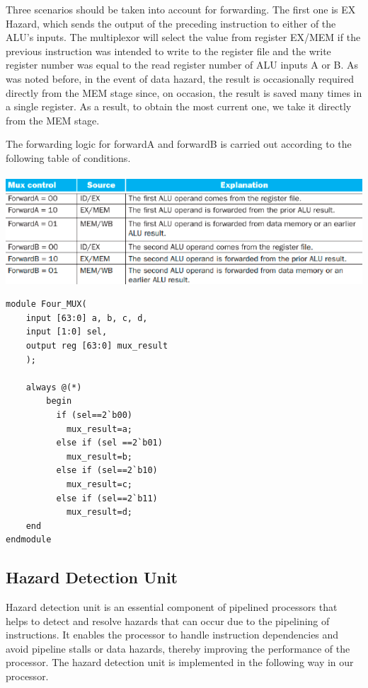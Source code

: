 \documentclass{article}
\begin{document}
Three scenarios should be taken into account for forwarding. The first one is EX Hazard, which sends the output of the preceding instruction to either of the ALU's inputs. The multiplexor will select the value from register EX/MEM if the previous instruction was intended to write to the register file and the write register number was equal to the read register number of ALU inputs A or B. As was noted before, in the event of data hazard, the result is occasionally required directly from the MEM stage since, on occasion, the result is saved many times in a single register. As a result, to obtain the most current one, we take it directly from the MEM stage.

The forwarding logic for forwardA and forwardB is carried out according to the following table of conditions.
\\ \\
\includegraphics*[width = 12.5 cm]{forwardingconditions.png}

\begin{lstlisting}[caption={IF/ID Register}, captionpos=b, language=RISC-V]
module Four_MUX(
    input [63:0] a, b, c, d, 
    input [1:0] sel, 
    output reg [63:0] mux_result
    );
    
    always @(*)
        begin
          if (sel==2`b00)
            mux_result=a;
          else if (sel ==2`b01)
            mux_result=b;
          else if (sel==2`b10)
            mux_result=c;
          else if (sel==2`b11)
            mux_result=d;    
    end 
endmodule
\end{lstlisting}
    
\subsection*{Hazard Detection Unit}
Hazard detection unit is an essential component of pipelined processors that helps to detect and resolve hazards that can occur due to the pipelining of instructions. It enables the processor to handle instruction dependencies and avoid pipeline stalls or data hazards, thereby improving the performance of the processor. The hazard detection unit is implemented in the following way in our processor.
\end{document}
